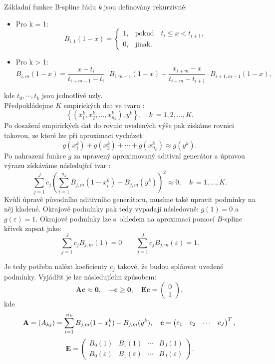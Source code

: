 Základní funkce B-spline řádu \textit{k} jsou definovány rekurzivně: \cite{Beliakov} \\
\begin{itemize}
    \item Pro k = 1:
\[
B_{i,1}(1-x) = 
\begin{cases}
    1, & \text{pokud} \quad t_i \leq x < t_{i+1}, \\
    0, & \text{jinak.}
\end{cases}
\]

 \item Pro k > 1:
\[
B_{i,m}(1-x) = \frac{x - t_i}{t_{i + m - 1} - t_i} \cdot B_{i, m - 1}(1-x)
+ \frac{x_{i + m} - x}{t_{i + m} - t_{i + 1}} \cdot B_{i + 1, m - 1}(1-x),
\]
\end{itemize}
kde \textit{$t_0, \cdots, t_k$} jsou jednotlivé uzly.  \\
Předpokládejme $K$ empirických dat ve tvaru \cite{Beliakov}:
$$
  \left\{ (x_1^k, x_2^k, \dots, x_{n_k}^k), y^k \right\}, \quad k~= 1, 2, \dots, K.
$$
Po dosažení empirických dat do rovnic uvedených výše pak získáme rovnici takovou, ze které lze při aproximaci vycházet:
$$
  g(x_1^k)+g(x_2^k)+\cdots + g(x_{n_k}^k) \approx g(y^k).
$$
Po nahrazení funkce $g$ za upravený aproximovaný aditivní generátor a \' upravou výrazu získáváme následující tvar \cite{Beliakov}:
$$
  \sum_{j = 1}^Jc_j\left( \sum_{i=1}^{n_k}B_{j,m}(1-x_i^k) - B_{j,m}(y^k) \right)^2 \approx 0, \quad k~= 1,\dots,K.
$$
Kv\r uli \' upravě p\r uvodního aditivního generátoru, musíme také upravit podmínky na něj kladené. Okrajové podmínky pak tedy vypadají následovně: $ g(1)=0$ a $g(\varepsilon) = 1$.
Okrajové podmínky lze s~ohledem na aproximaci pomocí $B$-spline křivek zapsat jako:
$$
  \sum_{j = 1}^Jc_jB_{j,m}(1) = 0\quad\quad\sum_{j = 1}^Jc_jB_{j,m}(\varepsilon) = 1.
$$

Je tedy potřeba nalézt koeficienty $c_j$ takové, že budou spl\v novat uvedené podmínky. Vyjádřit je lze následujícím zp\r usobem: \cite{havlena} $$\mathbf{Ac} \approx \mathbf{0},\quad\mathbf{-c} \geq \mathbf{0},\quad\mathbf{Ec} = \begin{pmatrix} 0 \\ 1 \end{pmatrix},$$
kde $$\mathbf{A} = (A_{kj}) = \sum_{i = 1}^{n_k}B_{j,m}(1-x_i^k) - B_{j,m}(y^k),\quad \mathbf{c} = \begin{pmatrix} c_1 & c_2 &\cdots&c_J \end{pmatrix}^T,\\$$
  $$\mathbf{E} = \begin{pmatrix} B_0(1) & B_1(1) &\cdots& B_J(1) \\ B_0(\varepsilon) & B_1(\varepsilon) &\cdots& B_J(\varepsilon) \end{pmatrix}.$$\\

